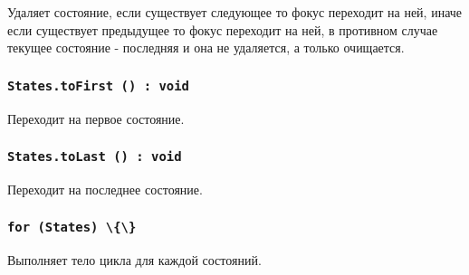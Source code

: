 Удаляет состояние, если существует следующее то фокус переходит на ней, иначе если существует предыдущее то фокус переходит на ней, в противном случае текущее состояние - последняя и она не удаляется, а только очищается.

\subsubsection{\lstinline|States.toFirst () : void|}

Переходит на первое состояние.

\subsubsection{\lstinline|States.toLast () : void|}

Переходит на последнее состояние.

\subsubsection{\lstinline|for (States) \{\}|}

Выполняет тело цикла для каждой состояний.

